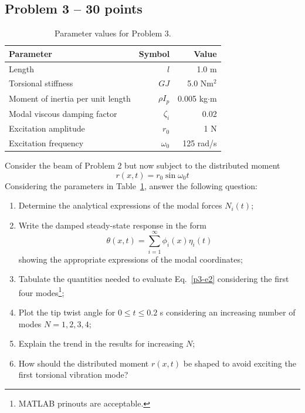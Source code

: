 \documentclass[11pt,a4paper]{article}
\begin{document}
\clearpage 

\subsection*{Problem 3 -- 30 points}

\begin{table}[htpt!]
	\centering
	\caption{Parameter values for Problem 3. \label{t2}}
	\vspace{2mm}
	\begin{tabular}{lrr}
		\toprule
		Parameter & Symbol & Value \\
		\midrule 
		Length & $l$ & 1.0 m \\
		Torsional stiffness & $GJ$ & 5.0 Nm$^2$\\
		Moment of inertia per unit length & $\rho I_p$ & 0.005 kg$\cdot$m\\
		Modal viscous damping factor & $\zeta_i$ & 0.02 \\
		Excitation amplitude & $r_0$ & 1 N \\
		Excitation frequency & $\omega_0$ & 125 rad/s\\
		\bottomrule
	\end{tabular}
\end{table}
%
Consider the beam of Problem 2 but now subject to the distributed moment
%
\begin{equation} \label{p3-e1}
	r(x,t) = r_0 \sin \omega_0 t
\end{equation}
% 
Considering the parameters in Table~\ref{t2}, answer the following question:
%
\begin{enumerate}
	\item Determine the analytical expressions of the modal forces $N_i(t)$;
	\item Write the damped steady-state response in the form
	\begin{equation} \label{p3-e2}
		\theta(x,t) = \sum_{i=1}^{\infty} \phi_i(x) \eta_i(t)
	\end{equation}
	showing the appropriate expressions of the modal coordinates;
	\item Tabulate the quantities needed to evaluate Eq.~\eqref{p3-e2} considering the first four modes\footnote{MATLAB prinouts are acceptable.};
	\item Plot the tip twist angle for $0 \le t \le 0.2$ s considering an increasing number of modes $N = 1, 2, 3, 4$;
	\item Explain the trend in the results for increasing $N$;
	\item How should the distributed moment $r(x,t)$ be shaped to avoid exciting the first torsional vibration mode?
\end{enumerate}
\end{document}
